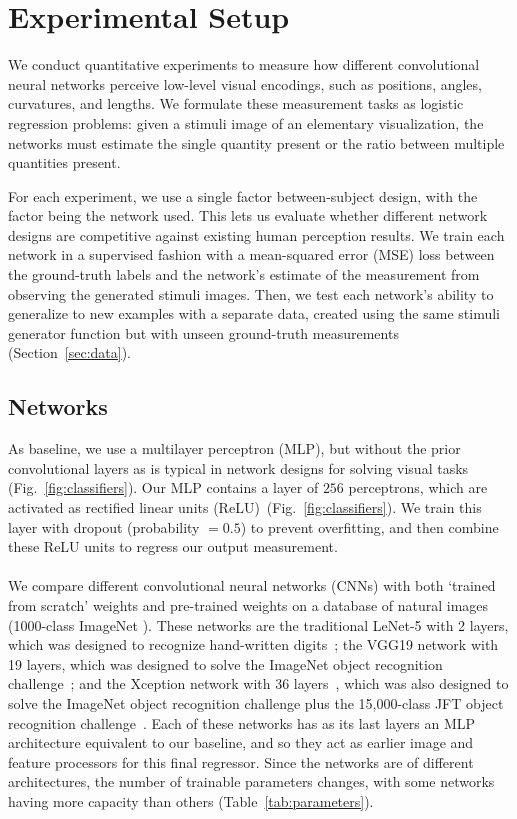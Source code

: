 \section{Experimental Setup}

We conduct quantitative experiments to measure how different convolutional neural networks perceive low-level visual encodings, such as positions, angles, curvatures, and lengths. We formulate these measurement tasks as logistic regression problems: given a stimuli image of an elementary visualization, the networks must estimate the single quantity present or the ratio between multiple quantities present. 

For each experiment, we use a single factor between-subject design, with the factor being the network used. This lets us evaluate whether different network designs are competitive against existing human perception results. We train each network in a supervised fashion with a mean-squared error (MSE) loss between the ground-truth labels and the network's estimate of the measurement from observing the generated stimuli images. Then, we test each network's ability to generalize to new examples with a separate data, created using the same stimuli generator function but with unseen ground-truth measurements (Section~\ref{sec:data}).


\subsection{Networks}
\label{sec:networks}

 As baseline, we use a multilayer perceptron (MLP), but without the prior convolutional layers as is typical in network designs for solving visual tasks (Fig.~\ref{fig:classifiers}). Our MLP contains a layer of $256$ perceptrons, which are activated as rectified linear units (ReLU)~(Fig.~\ref{fig:classifiers}). We train this layer with dropout (probability $= 0.5$) to prevent overfitting, and then combine these ReLU units to regress our output measurement.
\\~\\
 We compare different convolutional neural networks (CNNs) with both `trained from scratch' weights and pre-trained weights on a database of natural images (1000-class ImageNet \cite{imagenet}). These networks are the traditional LeNet-5 with 2 layers, which was designed to recognize hand-written digits~\cite{lenet}; the VGG19 network with 19 layers, which was designed to solve the ImageNet object recognition challenge~\cite{simonyan_very_deep2014}; and the Xception network with 36 layers~\cite{xception}, which was also designed to solve the ImageNet object recognition challenge plus the 15,000-class JFT object recognition challenge~\cite{Hinton2015}. Each of these networks has as its last layers an MLP architecture equivalent to our baseline, and so they act as earlier image and feature processors for this final regressor. Since the networks are of different architectures, the number of trainable parameters changes, with some networks having more capacity than others (Table~\ref{tab:parameters}).

